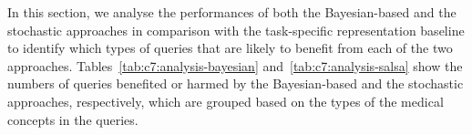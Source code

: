 \documentclass[1p]{elsarticle}
\begin{document}


In this section, we analyse the performances of both the Bayesian-based and the stochastic approaches in comparison with the task-specific representation baseline to identify which types of queries that are likely to benefit from each of the two approaches. 
Tables~\ref{tab:c7:analysis-bayesian} and~\ref{tab:c7:analysis-salsa} show the numbers of queries benefited or harmed by the Bayesian-based and the stochastic approaches, respectively, which are grouped based on the types of the medical concepts in the queries. 
\end{document}
